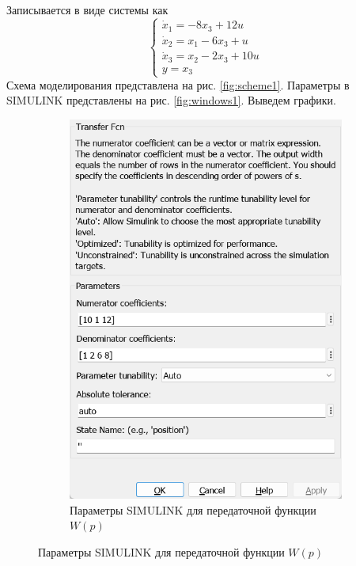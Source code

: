 \documentclass[a4paper, 12pt]{article}
\begin{document}
    Записывается в виде системы как
    $$
    \begin{cases}
        \dot{x}_1=-8x_3+12u\\
        \dot{x}_2=x_1-6x_3+u\\
        \dot{x}_3=x_2-2x_3+10u\\
        y=x_3
    \end{cases}
    $$
    Схема моделирования представлена на рис. \ref{fig:scheme1}. Параметры в SIMULINK представлены на рис. \ref{fig:windows1}. Выведем графики.
    \begin{figure}[H]
        \centering
        \begin{subfigure}{0.3\textwidth}
            \centering
            \includegraphics[width=\linewidth]{W_p_1_window.png}
            \caption{Параметры SIMULINK для передаточной функции $W(p)$}
            \label{fig:wp1w}
        \end{subfigure}

\end{figure}
\end{document}
